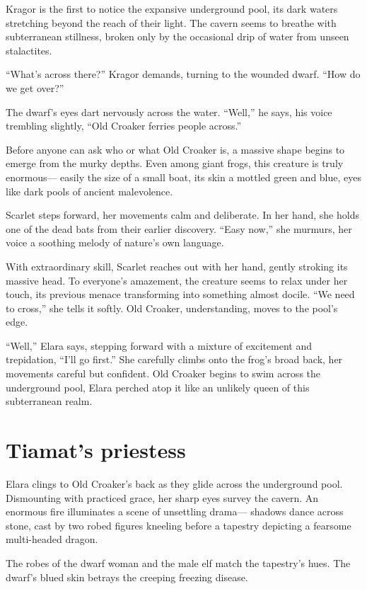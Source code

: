 \documentclass[
  letterpaper,12pt,twoside,twocolumn,openany,
  nodeprecatedcode,bg=full]{dndbook}
\begin{document}
Kragor is the first to notice the expansive underground pool, its dark
waters stretching beyond the reach of their light. The cavern seems to
breathe with subterranean stillness, broken only by the occasional drip
of water from unseen stalactites.

``What's across there?'' Kragor demands, turning to the wounded dwarf.
``How do we get over?''

The dwarf's eyes dart nervously across the water. ``Well,'' he says, his
voice trembling slightly, ``Old Croaker ferries people across.''

Before anyone can ask who or what Old Croaker is, a massive shape begins
to emerge from the murky depths. Even among giant frogs, this creature
is truly enormous--- easily the size of a small boat, its skin a mottled
green and blue, eyes like dark pools of ancient malevolence.

Scarlet steps forward, her movements calm and deliberate. In her hand,
she holds one of the dead bats from their earlier discovery. ``Easy
now,'' she murmurs, her voice a soothing melody of nature's own
language.

With extraordinary skill, Scarlet reaches out with her hand, gently
stroking its massive head. To everyone's amazement, the creature seems
to relax under her touch, its previous menace transforming into
something almost docile. ``We need to cross,'' she tells it softly. Old
Croaker, understanding, moves to the pool's edge.

``Well,'' Elara says, stepping forward with a mixture of excitement and
trepidation, ``I'll go first.'' She carefully climbs onto the frog's
broad back, her movements careful but confident. Old Croaker begins to
swim across the underground pool, Elara perched atop it like an unlikely
queen of this subterranean realm.

\section{Tiamat's priestess}\label{tiamats-priestess}

Elara clings to Old Croaker's back as they glide across the underground
pool. Dismounting with practiced grace, her sharp eyes survey the
cavern. An enormous fire illuminates a scene of unsettling drama---
shadows dance across stone, cast by two robed figures kneeling before a
tapestry depicting a fearsome multi-headed dragon.

The robes of the dwarf woman and the male elf match the tapestry's hues.
The dwarf's blued skin betrays the creeping freezing disease.
\end{document}
